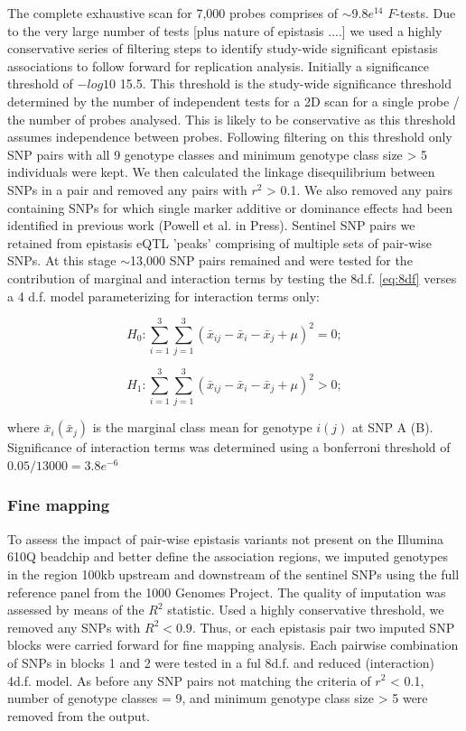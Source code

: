 \documentclass[paper=a4, fontsize=11pt]{scrartcl}	%
\numberwithin{equation}{section}									%
\numberwithin{figure}{section}										%
\numberwithin{table}{section}										%
\begin{document}
The complete exhaustive scan for 7,000 probes comprises of $\sim$9.8$e^{14}$ $F$-tests. Due to the very large number of tests [plus nature of epistasis ....] we used a highly conservative series of filtering steps to identify study-wide significant epistasis associations to follow forward for replication analysis. Initially a significance threshold of $-log10$ 15.5. This threshold is the study-wide significance threshold determined by the number of independent tests for a 2D scan for a single probe / the number of probes analysed. This is likely to be conservative as this threshold assumes independence between probes. Following filtering on this threshold only SNP pairs with all 9 genotype classes and minimum genotype class size > 5 individuals were kept. We then calculated the linkage disequilibrium between SNPs in a pair and removed any pairs with $r^2$ > 0.1. We also removed any pairs containing SNPs for which single marker additive or dominance effects had been identified  in previous work (Powell et al. in Press). Sentinel  SNP pairs we retained from epistasis eQTL 'peaks' comprising of multiple sets of pair-wise SNPs. At this stage $\sim$13,000 SNP pairs remained and were tested for the contribution of marginal and interaction terms by testing the 8d.f. \ref{eq:8df} verses a 4 d.f. model parameterizing for interaction terms only:

\begin{equation}
H _0: \sum _{i=1} ^3 \sum _{j=1} ^3 (\bar x _{ij} - \bar x _i - \bar x _j + \mu) ^2 = 0;
\end{equation}

\begin{equation}
H _1: \sum _{i=1} ^3 \sum _{j=1} ^3 (\bar x _{ij} - \bar x _i - \bar x _j + \mu) ^2 > 0;
\label{eq:4df}
\end{equation}

where $\bar x _i (\bar x _j)$ is the marginal class mean for genotype $i (j)$ at SNP A (B). Significance of interaction terms was determined using a bonferroni threshold of $0.05 / 13000 = 3.8e^{-6}$ 


\subsubsection{Fine mapping}

To assess the impact of pair-wise epistasis variants not present on the Illumina 610Q beadchip and better define the association regions, we imputed genotypes in the region 100kb upstream and downstream of the sentinel SNPs using the full reference panel from the 1000 Genomes Project. The quality of imputation was assessed by means of the $R^2$ statistic. Used a highly conservative threshold, we removed any SNPs with $R^2 < 0.9$. Thus, or each epistasis pair two imputed SNP blocks were carried forward for fine mapping analysis. Each pairwise combination of SNPs in blocks 1 and 2 were tested in a ful 8d.f. and reduced (interaction) 4d.f. model. As before any SNP pairs not matching the criteria of $r^2$  < 0.1, number of genotype classes = 9, and minimum genotype class size > 5 were removed from the output. 
\end{document}

